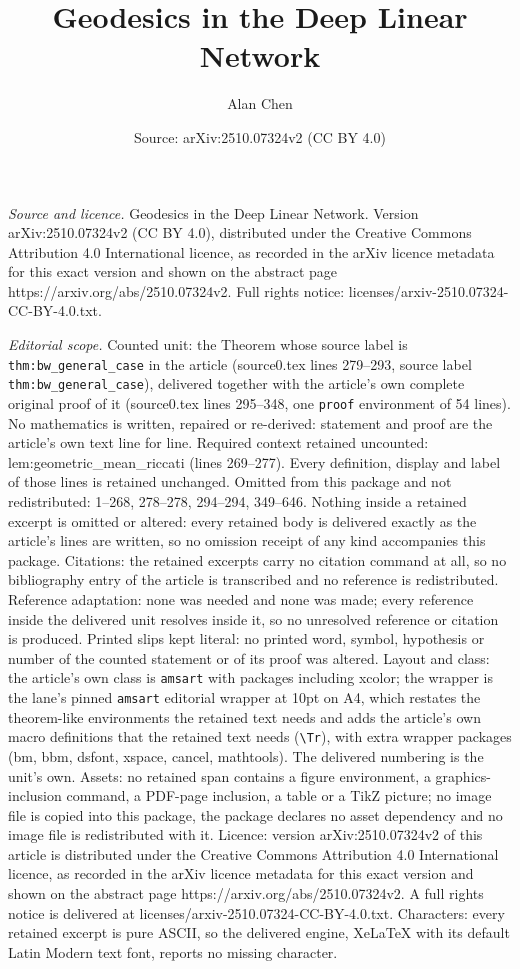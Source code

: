 \documentclass[10pt,a4paper]{amsart}
\title[Geodesics in the Deep Linear Network]{Geodesics in the Deep Linear Network}
\author{Alan Chen}
\date{Source: arXiv:2510.07324v2 (CC BY 4.0)}
\begin{document}
\maketitle

\noindent\emph{Source and licence.} Geodesics in the Deep Linear Network. Version arXiv:2510.07324v2 (CC BY 4.0), distributed under the Creative Commons Attribution 4.0 International licence, as recorded in the arXiv licence metadata for this exact version and shown on the abstract page https://arxiv.org/abs/2510.07324v2. Full rights notice: licenses/arxiv-2510.07324-CC-BY-4.0.txt.\par\smallskip

\noindent\textit{Editorial scope.} Counted unit: the Theorem whose source label is \texttt{thm:bw\_general\_case} in the article (source0.tex lines 279--293, source label \texttt{thm:bw\_general\_case}), delivered together with the article's own complete original proof of it (source0.tex lines 295--348, one \texttt{proof} environment of 54 lines). No mathematics is written, repaired or re-derived: statement and proof are the article's own text line for line. Required context retained uncounted: lem:geometric\_mean\_riccati (lines 269--277). Every definition, display and label of those lines is retained unchanged. Omitted from this package and not redistributed: 1--268, 278--278, 294--294, 349--646. Nothing inside a retained excerpt is omitted or altered: every retained body is delivered exactly as the article's lines are written, so no omission receipt of any kind accompanies this package. Citations: the retained excerpts carry no citation command at all, so no bibliography entry of the article is transcribed and no reference is redistributed. Reference adaptation: none was needed and none was made; every reference inside the delivered unit resolves inside it, so no unresolved reference or citation is produced. Printed slips kept literal: no printed word, symbol, hypothesis or number of the counted statement or of its proof was altered. Layout and class: the article's own class is \texttt{amsart} with packages including xcolor; the wrapper is the lane's pinned \texttt{amsart} editorial wrapper at 10pt on A4, which restates the theorem-like environments the retained text needs and adds the article's own macro definitions that the retained text needs (\texttt{\textbackslash Tr}), with extra wrapper packages (bm, bbm, dsfont, xspace, cancel, mathtools). The delivered numbering is the unit's own. Assets: no retained span contains a figure environment, a graphics-inclusion command, a PDF-page inclusion, a table or a TikZ picture; no image file is copied into this package, the package declares no asset dependency and no image file is redistributed with it. Licence: version arXiv:2510.07324v2 of this article is distributed under the Creative Commons Attribution 4.0 International licence, as recorded in the arXiv licence metadata for this exact version and shown on the abstract page https://arxiv.org/abs/2510.07324v2. A full rights notice is delivered at licenses/arxiv-2510.07324-CC-BY-4.0.txt. Characters: every retained excerpt is pure ASCII, so the delivered engine, XeLaTeX with its default Latin Modern text font, reports no missing character.
\end{document}
